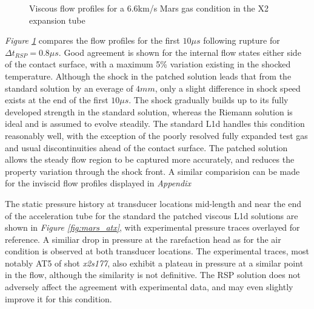 \documentclass[a4paper,10pt]{article}
\begin{document}
\begin{figure}[htb]
\begin{center}
{{      } \quad
      }
    \caption{Viscous flow profiles for a 6.6km/s Mars gas condition in the X2 expansion tube}
    \label{fig:mars_profiles_viscous}
  \end{center}
\end{figure}

\emph{Figure \ref{fig:mars_profiles_viscous}} compares the flow profiles for the first $10 \mu s$ following rupture for $\Delta t_{RSP} = 0.8 \mu s$.   Good agreement is shown for the internal flow states either side of the contact surface, with a maximum 5\% variation existing in the shocked temperature.  Although the shock in the patched solution leads that from the standard solution by an everage of $4mm$, only a slight difference in shock speed exists at the end of the first $10\mu s$.  The shock gradually builds up to its fully developed strength in the standard solution, whereas the Riemann solution is ideal and is assumed to evolve steadily.  The standard L1d handles this condition reasonably well, with the exception of the poorly resolved fully expanded test gas and usual discontinuities ahead of the contact surface.  The patched solution allows the steady flow region to be captured more accurately, and reduces the property variation through the shock front. A similar comparision can be made for the inviscid flow profiles displayed in \emph{Appendix \label{appendix_B}}

\medskip

The static pressure history at transducer locations mid-length and near the end of the acceleration tube for the standard the patched viscous L1d solutions are shown in \emph{Figure \ref{fig:mars_atx}}, with experimental pressure traces overlayed for reference.  A similiar drop in pressure at the rarefaction head as for the air condition is observed at both transducer locations.  The experimental traces, most notably AT5 of shot \emph{x2s177}, also exhibit a plateau in pressure at a similar point in the flow, although the similarity is not definitive.  The RSP solution does not adversely affect the agreement with experimental data, and may even slightly improve it for this condition.
\end{document}
